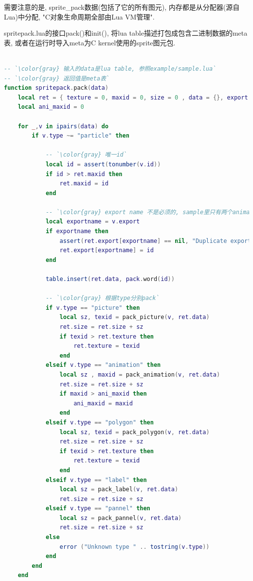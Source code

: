 {需要注意的是, sprite\_pack数据(包括了它的所有图元), 内存都是从分配器(源自Lua)中分配, "C对象生命周期全部由Lua VM管理". }\par
{spritepack.lua的接口pack()和init(), 将lua table描述打包成包含二进制数据的meta表, 或者在运行时导入meta为C kernel使用的sprite图元包. }\par

\begin{lstlisting}[language=lua]

-- `\color{gray} 输入的data是lua table, 参照example/sample.lua`
-- `\color{gray} 返回值是meta表`
function spritepack.pack(data)
    local ret = { texture = 0, maxid = 0, size = 0 , data = {}, export = {} }
    local ani_maxid = 0

    for _,v in ipairs(data) do
        if v.type ~= "particle" then

            -- `\color{gray} 唯一id`
            local id = assert(tonumber(v.id))
            if id > ret.maxid then
                ret.maxid = id
            end

            -- `\color{gray} export name 不是必须的, sample里只有两个animation有`
            local exportname = v.export
            if exportname then
                assert(ret.export[exportname] == nil, "Duplicate export name"..exportname)
                ret.export[exportname] = id
            end

            table.insert(ret.data, pack.word(id))

            -- `\color{gray} 根据type分别pack`
            if v.type == "picture" then
                local sz, texid = pack_picture(v, ret.data)
                ret.size = ret.size + sz
                if texid > ret.texture then
                    ret.texture = texid
                end
            elseif v.type == "animation" then
                local sz , maxid = pack_animation(v, ret.data)
                ret.size = ret.size + sz
                if maxid > ani_maxid then
                    ani_maxid = maxid
                end
            elseif v.type == "polygon" then
                local sz, texid = pack_polygon(v, ret.data)
                ret.size = ret.size + sz
                if texid > ret.texture then
                    ret.texture = texid
                end
            elseif v.type == "label" then
                local sz = pack_label(v, ret.data)
                ret.size = ret.size + sz
            elseif v.type == "pannel" then
                local sz = pack_pannel(v, ret.data)
                ret.size = ret.size + sz
            else
                error ("Unknown type " .. tostring(v.type))
            end
        end
    end


\end{lstlisting}
